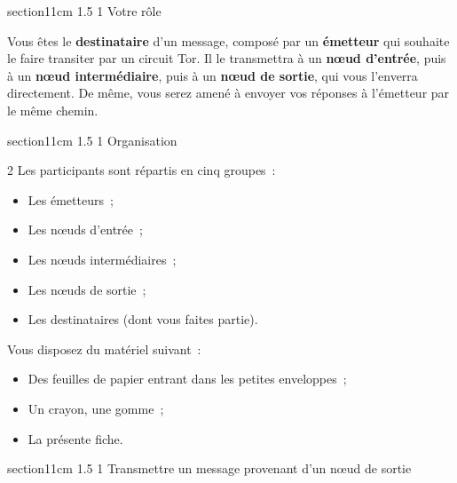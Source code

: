 \documentclass[a4paper,twoside,french]{article}
\makeatletter
\renewcommand\section{\@startsection
  {section}{1}{1cm}%
  {1.5\baselineskip}%
  {1\baselineskip}%
  {\normalfont\Large\bfseries}}%
\makeatother
\begin{document}
  \section{Votre rôle}

  Vous êtes le \textbf{destinataire} d'un message, composé par un
  \textbf{émetteur} qui souhaite le faire transiter par un circuit
  Tor. Il le transmettra à un \textbf{n\oe ud d'entrée}, puis à un
  \textbf{n\oe ud intermédiaire}, puis à un \textbf{n\oe ud de
    sortie}, qui vous l'enverra directement. De même, vous serez amené
  à envoyer vos réponses à l'émetteur par le même chemin.
  
  \section{Organisation}

  \begin{multicols}{2}
    Les participants sont répartis en cinq groupes~:
    \begin{itemize}
    \item Les émetteurs~;
    \item Les n\oe uds d'entrée~;
    \item Les n\oe uds intermédiaires~;
    \item Les n\oe uds de sortie~;
    \item Les destinataires (dont vous faites partie).
    \end{itemize}
    \vfill\columnbreak

    Vous disposez du matériel suivant~:
    \begin{itemize}
    \item Des feuilles de papier entrant dans les petites enveloppes~;
    \item Un crayon, une gomme~;
    \item La présente fiche.
    \end{itemize}
  \end{multicols}

  \section{Transmettre un message provenant d'un n\oe ud de sortie}
\end{document}
